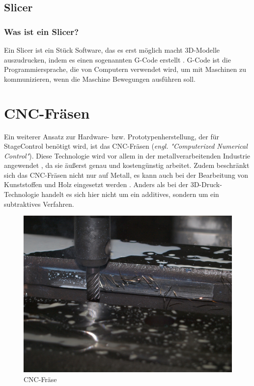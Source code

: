 \subsection{Slicer}
\subsubsection{Was ist ein Slicer?}
Ein Slicer ist ein Stück Software, das es erst möglich macht 3D-Modelle auszudrucken, indem es einen sogenannten G-Code erstellt . G-Code ist die Programmiersprache, die von Computern verwendet wird, um mit Maschinen zu kommunizieren, wenn die Maschine Bewegungen ausführen soll. \parencite{SlicerGCode} \\



\section{CNC-Fräsen}

Ein weiterer Ansatz zur Hardware- bzw. Prototypenherstellung, der für StageControl benötigt wird, ist das CNC-Fräsen (\textit{engl. "Computerized Numerical Control"}). Diese Technologie wird vor allem in der metallverarbeitenden Industrie angewendet \parencite{CNCFraesen}, da sie äußerst genau und kostengünstig arbeitet. Zudem beschränkt sich das CNC-Fräsen nicht nur auf Metall, es kann auch bei der Bearbeitung von Kunststoffen und Holz eingesetzt werden \parencite{CNCFraesen2}. Anders als bei der 3D-Druck-Technologie handelt es sich hier nicht um ein additives, sondern um ein subtraktives Verfahren.\\  \parencite{CNCFraesen3}


\begin{figure}[H]
	\centering
	\includegraphics[width=0.6\linewidth]{images/CNC.jpg}
	\caption[CNC-Fräse]{CNC-Fräse}
	\label{fig:cnc-fraese}
\end{figure}

